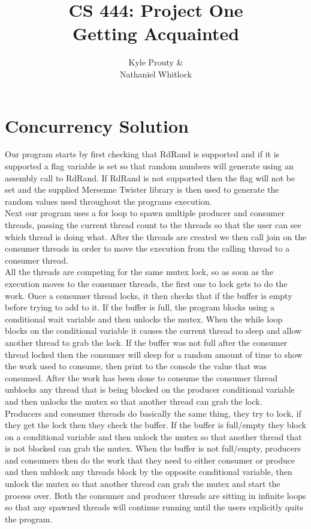 \documentclass[a4paper]{article}
\title{CS 444: Project One\\\Large{Getting Acquainted}}
\author{Kyle Prouty \&\\Nathaniel Whitlock}
\begin{document}
\maketitle

\section{Concurrency Solution} 
Our program starts by first checking that RdRand is supported and if it is supported a flag variable is set so that random numbers will generate using an assembly call to RdRand. If RdRand is not supported then the flag will not be set and the supplied Mersenne Twister library is then used to generate the random values used throughout the programs execution. \\

Next our program uses a for loop to spawn multiple producer and consumer threads, passing the current thread count to the threads so that the user can see which thread is doing what. After the threads are created we then call join on the consumer threads in order to move the execution from the calling thread to a consumer thread. \\

All the threads are competing for the same mutex lock, so as soon as the execution moves to the consumer threads, the first one to lock gets to do the work. Once a consumer thread locks, it then checks that if the buffer is empty before trying to add to it. If the buffer is full, the program blocks using a conditional wait variable and then unlocks the mutex. When the while loop blocks on the conditional variable it causes the current thread to sleep and allow another thread to grab the lock. If the buffer was not full after the consumer thread locked then the consumer will sleep for a random amount of time to show the work used to consume, then print to the console the value that was consumed. After the work has been done to consume the consumer thread unblocks any thread that is being blocked on the producer conditional variable and then unlocks the mutex so that another thread can grab the lock. \\

Producers and consumer threads do basically the same thing, they try to lock, if they get the lock then they check the buffer. If the buffer is full/empty they block on a conditional variable and then unlock the mutex so that another thread that is not blocked can grab the mutex. When the buffer is not full/empty, producers and consumers then do the work that they need to either consumer or produce and then unblock any threads block by the opposite conditional variable, then unlock the mutex so that another thread can grab the mutex and start the process over. Both the consumer and producer threads are sitting in infinite loops so that any spawned threads will continue running until the users explicitly quits the program.
\end{document}
